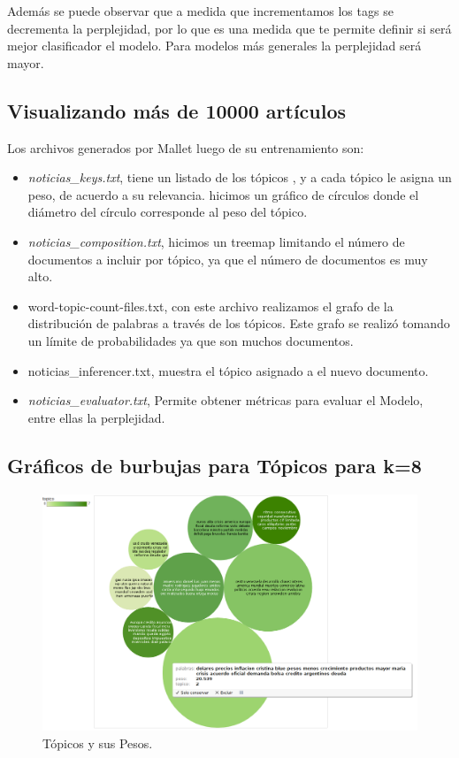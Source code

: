 \documentclass[8.5pt,twoside,twocolumn]{article}
\begin{document}
Adem\'as se puede observar que a medida que incrementamos los tags se decrementa la perplejidad, 
por lo que es una medida que te permite definir si ser\'a mejor clasificador el modelo.
Para modelos m\'as generales la perplejidad  ser\'a mayor.

\subsection{ Visualizando m\'as de 10000 art\'iculos}
Los archivos generados por Mallet luego de su entrenamiento son:
\begin{itemize}
\item \emph{noticias\_keys.txt}, tiene un listado de los t\'opicos , y a cada t\'opico le asigna un peso, de acuerdo a su relevancia. hicimos un gr\'afico de c\'irculos donde el di\'ametro del c\'irculo corresponde al peso del t\'opico.  
\item \emph{noticias\_composition.txt}, hicimos un treemap limitando el n\'umero de documentos a incluir por t\'opico, ya que el n\'umero de documentos es muy alto.
\item word-topic-count-files.txt, con este archivo realizamos el grafo de la distribuci\'on de palabras a trav\'es de los t\'opicos.
      Este grafo se realiz\'o tomando un l\'imite de probabilidades ya que son muchos documentos.
\item noticias\_inferencer.txt, muestra el t\'opico asignado a el nuevo documento.
\item \emph{noticias\_evaluator.txt}, Permite obtener m\'etricas para evaluar el Modelo, entre ellas la perplejidad.
\end{itemize}

\subsection{ Gr\'aficos de burbujas para T\'opicos para k=8  }
\begin{figure}[h]
  \centering
  \includegraphics[scale=0.2]{burble_k8_5_mallet_keys.png}
  \caption{T\'opicos y sus Pesos.}  
  \label{fgr:perplexity}
\end{figure}
\end{document}
